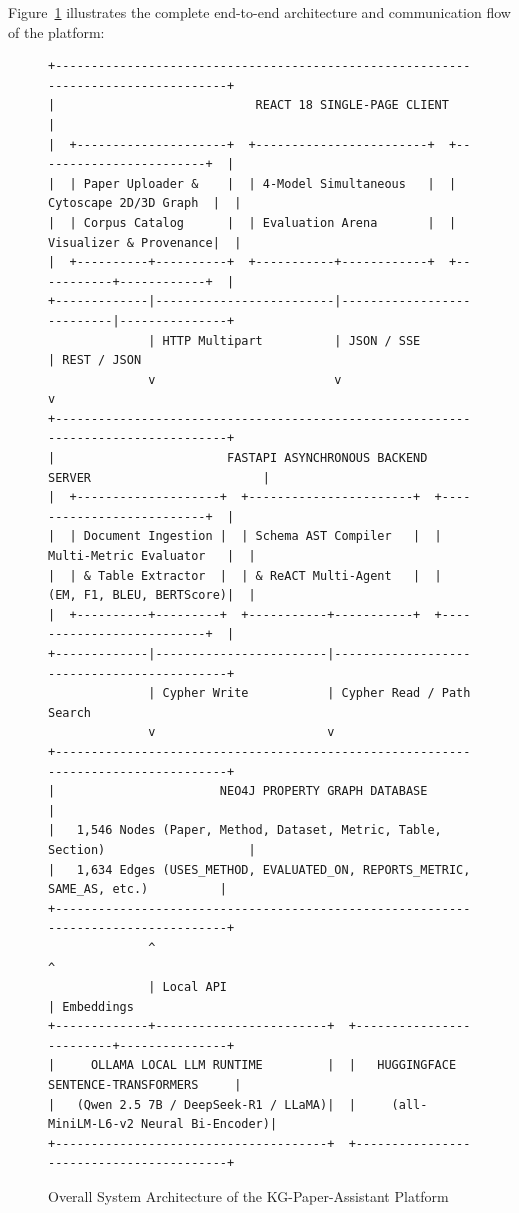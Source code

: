 Figure~\ref{fig:overall_arch} illustrates the complete end-to-end architecture and communication flow of the platform:
\begin{figure}[h]
\centering
\begin{verbatim}
+-----------------------------------------------------------------------------------+
|                            REACT 18 SINGLE-PAGE CLIENT                            |
|  +---------------------+  +------------------------+  +------------------------+  |
|  | Paper Uploader &    |  | 4-Model Simultaneous   |  | Cytoscape 2D/3D Graph  |  |
|  | Corpus Catalog      |  | Evaluation Arena       |  | Visualizer & Provenance|  |
|  +----------+----------+  +-----------+------------+  +-----------+------------+  |
+-------------|-------------------------|---------------------------|---------------+
              | HTTP Multipart          | JSON / SSE                | REST / JSON
              v                         v                           v
+-----------------------------------------------------------------------------------+
|                        FASTAPI ASYNCHRONOUS BACKEND SERVER                        |
|  +--------------------+  +-----------------------+  +--------------------------+  |
|  | Document Ingestion |  | Schema AST Compiler   |  | Multi-Metric Evaluator   |  |
|  | & Table Extractor  |  | & ReACT Multi-Agent   |  | (EM, F1, BLEU, BERTScore)|  |
|  +----------+---------+  +-----------+-----------+  +--------------------------+  |
+-------------|------------------------|--------------------------------------------+
              | Cypher Write           | Cypher Read / Path Search
              v                        v
+-----------------------------------------------------------------------------------+
|                       NEO4J PROPERTY GRAPH DATABASE                               |
|   1,546 Nodes (Paper, Method, Dataset, Metric, Table, Section)                    |
|   1,634 Edges (USES_METHOD, EVALUATED_ON, REPORTS_METRIC, SAME_AS, etc.)          |
+-----------------------------------------------------------------------------------+
              ^                                                     ^
              | Local API                                           | Embeddings
+-------------+------------------------+  +-------------------------+---------------+
|     OLLAMA LOCAL LLM RUNTIME         |  |   HUGGINGFACE SENTENCE-TRANSFORMERS     |
|   (Qwen 2.5 7B / DeepSeek-R1 / LLaMA)|  |     (all-MiniLM-L6-v2 Neural Bi-Encoder)|
+--------------------------------------+  +-----------------------------------------+
\end{verbatim}
\caption{Overall System Architecture of the KG-Paper-Assistant Platform}
\label{fig:overall_arch}
\end{figure}

